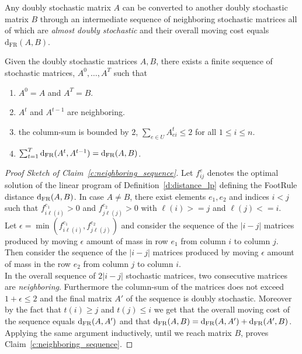 \noindent Any doubly stochastic matrix $A$ can be converted to another doubly stochastic matrix $B$ through an intermediate sequence of neighboring stochastic matrices all of which are \textit{almost doubly stochastic}
and their overall moving cost equals $\mathrm{d}_{\mathrm{FR}}(A,B)$.
\begin{claim}\label{c:neighboring_sequence}
Given the doubly stochastic matrices $A,B$, there exists a finite sequence of stochastic matrices, $A^0,\ldots,A^T$ such that
\begin{enumerate}
    \item $A^0= A$ and $A^T = B$.
    
    \item $A^t$ and $A^{t-1}$ are neighboring.
    
    \item the column-sum is bounded by $2$, $\sum_{e \in U} A_{ei}^t \leq 2$ for all $1\leq i \leq n$.
    
    \item $\sum_{t=1}^T \mathrm{d}_{\mathrm{FR}}(A^t, A^{t-1}) = \mathrm{d}_{\mathrm{FR}}(A,B)$.
\end{enumerate}
\end{claim}
\begin{proof}[Proof Sketch of Claim~\ref{c:neighboring_sequence}]
Let $f_{ij}^e$ denotes the optimal solution of the linear program of Definition~\ref{d:distance_lp} defining the FootRule distance $\mathrm{d}_{\mathrm{FR}}(A,B)$.  
In case $A\neq B$, there exist elements $e_1 , e_2$ and indices $i<j$ such that $f_{i\ell(i)}^{e_1} > 0$ and $f_{j\ell(j)}^{e_2} > 0$ with $\ell(i) >= j$ and $\ell(j) <=i$.\\

\noindent Let $\epsilon = \min(f_{i\ell(i)}^{e_1}, f_{j\ell(j)}^{e_2})$ and consider the sequence of the $|i-j|$ matrices produced by moving $\epsilon$ amount of mass in row $e_1$ from column $i$ to column $j$. Then consider the sequence of the $|i-j|$ matrices produced by moving $\epsilon$ amount of mass in the row $e_2$ from column $j$ to column $i$.\\

\noindent In the overall sequence of $2|i-j|$ stochastic matrices, two consecutive matrices are \textit{neighboring}. Furthermore the column-sum of the matrices does not exceed $1 + \epsilon \leq 2$ and the final matrix $A'$ of the sequence is doubly stochastic. Moreover by the fact that $t(i) \geq j$ and $t(j) \leq i$ we get that the overall moving cost of the sequence equals $\mathrm{d}_{\mathrm{FR}}(A,A')$ and that 
$\mathrm{d}_{\mathrm{FR}}(A,B) = \mathrm{d}_{\mathrm{FR}}(A,A') + \mathrm{d}_{\mathrm{FR}}(A',B)$. Applying the same argument inductively, until we reach matrix $B$, proves Claim~\ref{c:neighboring_sequence}.
\end{proof}


